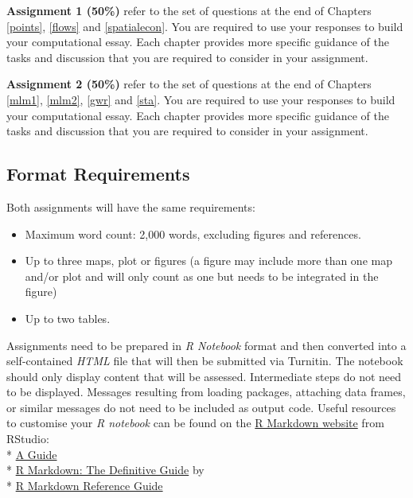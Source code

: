 \documentclass[
]{book}
\providecommand{\tightlist}{%
  \setlength{\itemsep}{0pt}\setlength{\parskip}{0pt}}
\begin{document}
\textbf{Assignment 1 (50\%)} refer to the set of questions at the end of Chapters \ref{points}, \ref{flows} and \ref{spatialecon}. You are required to use your responses to build your computational essay. Each chapter provides more specific guidance of the tasks and discussion that you are required to consider in your assignment.

\textbf{Assignment 2 (50\%)} refer to the set of questions at the end of Chapters \ref{mlm1}, \ref{mlm2}, \ref{gwr} and \ref{sta}. You are required to use your responses to build your computational essay. Each chapter provides more specific guidance of the tasks and discussion that you are required to consider in your assignment.

\hypertarget{format-requirements}{%
\subsection{Format Requirements}\label{format-requirements}}

Both assignments will have the same requirements:

\begin{itemize}
\tightlist
\item
  Maximum word count: 2,000 words, excluding figures and references.
\item
  Up to three maps, plot or figures (a figure may include more than one map and/or plot and will only count as one but needs to be integrated in the figure)
\item
  Up to two tables.
\end{itemize}

Assignments need to be prepared in \emph{R Notebook} format and then converted into
a self-contained \emph{HTML} file that will then be submitted via Turnitin.
The notebook should only display content that will be assessed.
Intermediate steps do not need to be displayed.
Messages resulting from loading packages, attaching data frames, or similar messages do not need to be included as output code.
Useful resources to customise your \emph{R notebook} can be found on the \href{https://rmarkdown.rstudio.com}{R Markdown website} from RStudio:\\
* \href{https://rmarkdown.rstudio.com/lesson-1.html}{A Guide}\\
* \href{https://bookdown.org/yihui/rmarkdown/}{R Markdown: The Definitive Guide} by \citet{xie2018r}\\
* \href{https://rstudio.com/wp-content/uploads/2015/03/rmarkdown-reference.pdf?_ga=2.199646894.1496049738.1611760832-141828105.1610798362}{R Markdown Reference Guide}
\end{document}

